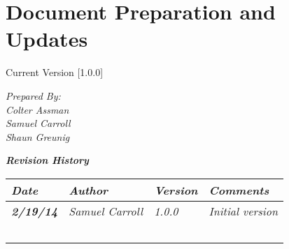 
\chapter{Document Preparation and Updates}

Current Version [1.0.0]
\vspace*{5mm}

{\color{MSBlue3}
\noindent
\textit{Prepared By:}\\
\textit{Colter Assman}\\
\textit{Samuel Carroll}\\
\textit{Shaun Greunig}
}

\vfill
\noindent
{\color{color02} \textit{\textbf{Revision History}}}\\
\begin{tabular}{|>{\raggedright}p{1.5cm}|>{\raggedright}p{3cm}|>{\raggedright}p{1.5cm}|>{\raggedright}p{9cm}|}
\hline
\textit{\textbf{Date}} &  \textit{\textbf{Author}} & \textit{\textbf{Version}} & \textit{\textbf{Comments}}\tabularnewline
\hline
 \textit{\textbf{2/19/14}} & \textit{Samuel Carroll} & \textit{1.0.0} & \textit{Initial version}\tabularnewline
\hline
 &  &  & \tabularnewline
 \hline
 &  &  & \tabularnewline
\hline
 &  &  & \tabularnewline
\hline
 &  &  & \tabularnewline
\hline
 &  &  & \tabularnewline
\hline
\end{tabular}
\vfill

